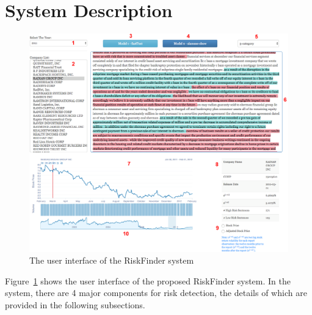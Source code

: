 \documentclass[10pt,conference,letterpaper]{IEEEtran}
\begin{document}
\section{System Description}\label{sec:system}
\begin{figure}
  \includegraphics[width=6.6in]{fig/platformdescription.png}
  \caption{The user interface of the RiskFinder system}\label{fig:platformdescription}
\end{figure}
Figure~\ref{fig:platformdescription} shows the user interface of the proposed RiskFinder system. In the system, there are 4 major components for risk detection, the details of which are provided in the following subsections.
\end{document}
